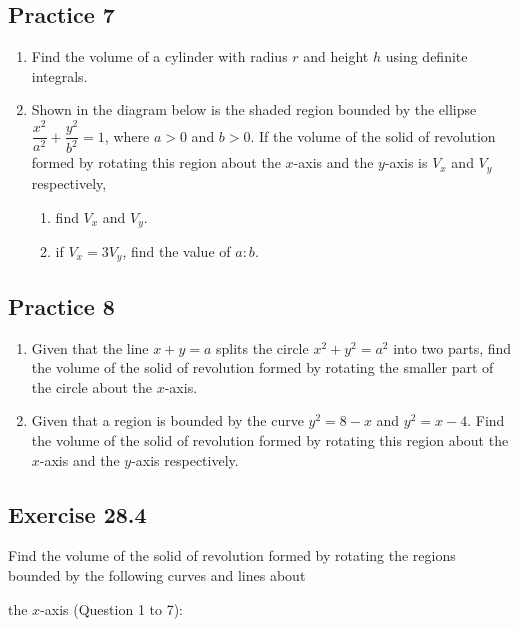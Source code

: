 \documentclass{report}
\begin{document}
\subsection{Practice 7}

\begin{enumerate}
    \item Find the volume of a cylinder with radius $r$ and height $h$ using definite
          integrals.
    \item Shown in the diagram below is the shaded region bounded by the ellipse
          $\dfrac{x^2}{a^2} + \dfrac{y^2}{b^2} = 1$, where $a > 0$ and $b > 0$. If the
          volume of the solid of revolution formed by rotating this region about the
          $x$-axis and the $y$-axis is $V_x$ and $V_y$ respectively,
          \begin{enumerate}
              \item find $V_x$ and $V_y$.
              \item if $V_x = 3V_y$, find the value of $a:b$.
          \end{enumerate}
\end{enumerate}

\subsection{Practice 8}

\begin{enumerate}
    \item Given that the line $x + y = a$ splits the circle $x^2 + y^2 = a^2$ into two
          parts, find the volume of the solid of revolution formed by rotating the
          smaller part of the circle about the $x$-axis.
    \item Given that a region is bounded by the curve $y^2 = 8 - x$ and $y^2 = x - 4$.
          Find the volume of the solid of revolution formed by rotating this region about
          the $x$-axis and the $y$-axis respectively.
\end{enumerate}

\subsection{Exercise 28.4}

\hspace*{10pt} Find the volume of the solid of revolution formed by rotating the regions bounded by the following curves and lines about

\hspace{-4pt} the $x$-axis (Question 1 to 7):
\end{document}
